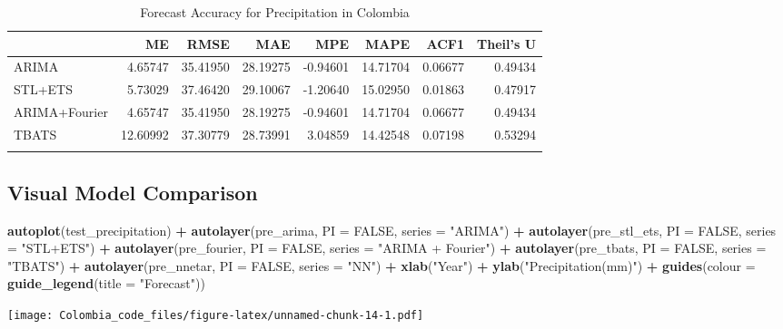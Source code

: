 \documentclass[
]{article}
\newenvironment{Shaded}{\begin{snugshade}}{\end{snugshade}}
\newcommand{\AttributeTok}[1]{\textcolor[rgb]{0.13,0.29,0.53}{#1}}
\newcommand{\ConstantTok}[1]{\textcolor[rgb]{0.56,0.35,0.01}{#1}}
\newcommand{\FunctionTok}[1]{\textcolor[rgb]{0.13,0.29,0.53}{\textbf{#1}}}
\newcommand{\NormalTok}[1]{#1}
\newcommand{\SpecialCharTok}[1]{\textcolor[rgb]{0.81,0.36,0.00}{\textbf{#1}}}
\newcommand{\StringTok}[1]{\textcolor[rgb]{0.31,0.60,0.02}{#1}}
\begin{document}
\begin{table}[!h]
\centering\centering
\caption{\label{tab:unnamed-chunk-13}Forecast Accuracy for Precipitation in Colombia}
\centering
\begin{tabular}[t]{l|r|r|r|r|r|r|r}
\hline
  & ME & RMSE & MAE & MPE & MAPE & ACF1 & Theil's U\\
\hline
ARIMA & 4.65747 & 35.41950 & 28.19275 & -0.94601 & 14.71704 & 0.06677 & 0.49434\\
\hline
STL+ETS & 5.73029 & 37.46420 & 29.10067 & -1.20640 & 15.02950 & 0.01863 & 0.47917\\
\hline
ARIMA+Fourier & 4.65747 & 35.41950 & 28.19275 & -0.94601 & 14.71704 & 0.06677 & 0.49434\\
\hline
TBATS & 12.60992 & 37.30779 & 28.73991 & 3.04859 & 14.42548 & 0.07198 & 0.53294\\
\hline
\cellcolor{gray!10}{NN} & \cellcolor{gray!10}{4.87180} & \cellcolor{gray!10}{34.49584} & \cellcolor{gray!10}{28.19237} & \cellcolor{gray!10}{-0.29821} & \cellcolor{gray!10}{14.40852} & \cellcolor{gray!10}{0.03339} & \cellcolor{gray!10}{0.51512}\\
\hline
\end{tabular}
\end{table}

\subsection{Visual Model Comparison}\label{visual-model-comparison}

\begin{Shaded}
\begin{Highlighting}[]
\FunctionTok{autoplot}\NormalTok{(test\_precipitation) }\SpecialCharTok{+} \FunctionTok{autolayer}\NormalTok{(pre\_arima, }\AttributeTok{PI =} \ConstantTok{FALSE}\NormalTok{,}
    \AttributeTok{series =} \StringTok{"ARIMA"}\NormalTok{) }\SpecialCharTok{+} \FunctionTok{autolayer}\NormalTok{(pre\_stl\_ets, }\AttributeTok{PI =} \ConstantTok{FALSE}\NormalTok{, }\AttributeTok{series =} \StringTok{"STL+ETS"}\NormalTok{) }\SpecialCharTok{+}
    \FunctionTok{autolayer}\NormalTok{(pre\_fourier, }\AttributeTok{PI =} \ConstantTok{FALSE}\NormalTok{, }\AttributeTok{series =} \StringTok{"ARIMA + Fourier"}\NormalTok{) }\SpecialCharTok{+}
    \FunctionTok{autolayer}\NormalTok{(pre\_tbats, }\AttributeTok{PI =} \ConstantTok{FALSE}\NormalTok{, }\AttributeTok{series =} \StringTok{"TBATS"}\NormalTok{) }\SpecialCharTok{+} \FunctionTok{autolayer}\NormalTok{(pre\_nnetar,}
    \AttributeTok{PI =} \ConstantTok{FALSE}\NormalTok{, }\AttributeTok{series =} \StringTok{"NN"}\NormalTok{) }\SpecialCharTok{+} \FunctionTok{xlab}\NormalTok{(}\StringTok{"Year"}\NormalTok{) }\SpecialCharTok{+} \FunctionTok{ylab}\NormalTok{(}\StringTok{"Precipitation(mm)"}\NormalTok{) }\SpecialCharTok{+}
    \FunctionTok{guides}\NormalTok{(}\AttributeTok{colour =} \FunctionTok{guide\_legend}\NormalTok{(}\AttributeTok{title =} \StringTok{"Forecast"}\NormalTok{))}
\end{Highlighting}
\end{Shaded}

\texttt{[image: Colombia\_code\_files/figure-latex/unnamed-chunk-14-1.pdf]}
\end{document}
